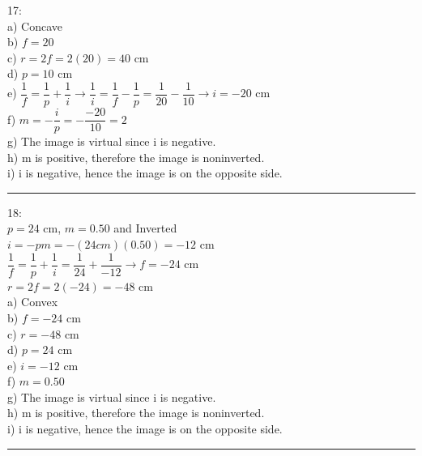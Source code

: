 \documentclass[fleqn]{article}
\begin{document}
\begin{enumerate}
    \textcolor{hwColor}{
      17:  \\
      a) Concave \\
      b) $f=20$ \\
      c) $r=2f=2(20)=40$ cm \\
      d) $p=10$ cm \\
      e) $\dfrac{1}{f}=\dfrac{1}{p}+\dfrac{1}{i} \rightarrow \dfrac{1}{i}=\dfrac{1}{f}-\dfrac{1}{p}=\dfrac{1}{20}-\dfrac{1}{10} \rightarrow i=-20$ cm \\
      f) $m=-\dfrac{i}{p}=-\dfrac{-20}{10}=2$ \\
      g) The image is virtual since i is negative. \\
      h) m is positive, therefore the image is noninverted. \\
      i) i is negative, hence the image is on the opposite side. \\
    }

    \textcolor{hwColor}{
      \rule{15cm}{0.4pt}
    }

    \textcolor{hwColor}{
      18: \\
      $p=24$ cm, $m=0.50$ and Inverted\\
      $i=-pm=-(24 cm)(0.50)=-12$ cm \\
      $\dfrac{1}{f}=\dfrac{1}{p}+\dfrac{1}{i}=\dfrac{1}{24}+\dfrac{1}{-12} \rightarrow f=-24$ cm \\
      $r=2f=2(-24)=-48$ cm \\
      a) Convex \\
      b) $f=-24$ cm \\
      c) $r=-48$ cm \\
      d) $p=24$ cm \\
      e) $i=-12$ cm \\
      f) $m=0.50$ \\
      g) The image is virtual since i is negative. \\
      h) m is positive, therefore the image is noninverted. \\
      i) i is negative, hence the image is on the opposite side. \\
    }

    \textcolor{hwColor}{
      \rule{15cm}{0.4pt}
    }


\end{enumerate}
\end{document}
